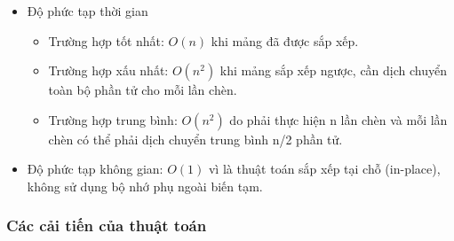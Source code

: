 \begin{itemize}
    \item Độ phức tạp thời gian
    \begin{itemize}[label=$\circ$]
        \item Trường hợp tốt nhất: $O(n)$ khi mảng đã được sắp xếp.
        \item Trường hợp xấu nhất: $O\left(n^2\right)$ khi mảng sắp xếp 
        ngược, cần dịch chuyển toàn bộ phần tử cho mỗi lần chèn.
        \item Trường hợp trung bình: $O\left(n^2\right)$ do phải thực 
        hiện n lần chèn và mỗi lần chèn có thể phải dịch chuyển trung 
        bình n/2 phần tử.
    \end{itemize}
    \item Độ phức tạp không gian: $O\left(1\right)$ vì là thuật toán 
    sắp xếp tại chỗ (in-place), không sử dụng bộ nhớ phụ ngoài biến tạm.
\end{itemize}

\subsubsection{Các cải tiến của thuật toán}

